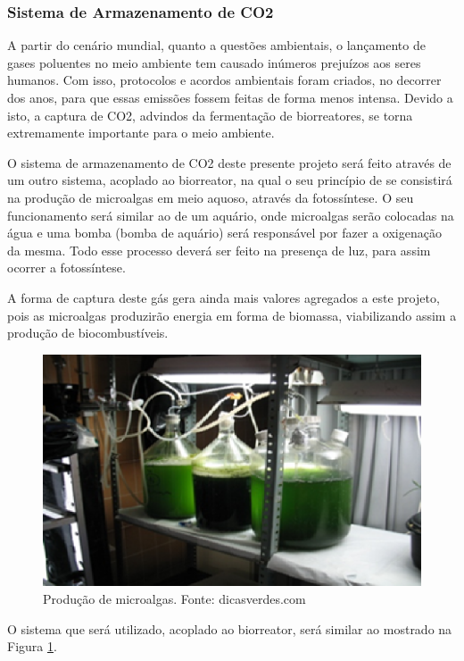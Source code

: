 \subsubsection{Sistema de Armazenamento de CO2}

A partir do cenário mundial, quanto a questões ambientais, o lançamento de gases poluentes no meio ambiente tem causado inúmeros prejuízos aos seres humanos. Com isso, protocolos e acordos ambientais foram criados, no decorrer dos anos, para que essas emissões fossem feitas de forma menos intensa. Devido a isto, a captura de CO2, advindos da fermentação de biorreatores, se torna extremamente importante para o meio ambiente.

O sistema de armazenamento de CO2 deste presente projeto será feito através de um outro sistema, acoplado ao biorreator, na qual o seu princípio de se consistirá na produção de microalgas em meio aquoso, através da fotossíntese. O seu funcionamento será similar ao de um aquário, onde microalgas serão colocadas na água e uma bomba (bomba de aquário) será responsável por fazer a oxigenação da mesma. Todo esse processo deverá ser feito na presença de luz, para assim ocorrer a fotossíntese.

A forma de captura deste gás gera ainda mais valores agregados a este projeto, pois as microalgas produzirão energia em forma de biomassa, viabilizando assim a produção de biocombustíveis.

\begin{figure}[h]
 \centering
 \includegraphics[keepaspectratio=true,scale=0.5]{figuras/algas.eps}
 \caption{Produção de microalgas. Fonte: dicasverdes.com}
 \label{algas}
\end{figure}

O sistema que será utilizado, acoplado ao biorreator, será similar ao mostrado na Figura \ref{algas}.

